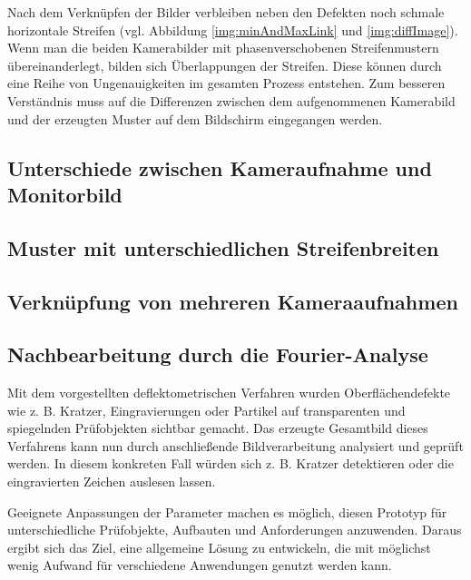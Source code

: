 Nach dem Verknüpfen der Bilder verbleiben neben den Defekten noch schmale horizontale Streifen (vgl. Abbildung \ref{img:minAndMaxLink} und \ref{img:diffImage}).
Wenn man die beiden Kamerabilder mit phasenverschobenen Streifenmustern übereinanderlegt, bilden sich Überlappungen der Streifen.
Diese können durch eine Reihe von Ungenauigkeiten im gesamten Prozess entstehen.
Zum besseren Verständnis muss auf die Differenzen zwischen dem aufgenommenen Kamerabild und der erzeugten Muster auf dem Bildschirm eingegangen werden.

{
	\FloatBarrier
    \subsection{Unterschiede zwischen Kameraufnahme und Monitorbild}
    \label{sub:unterschiedeKameraUndMonitor}
    
}

{
	\FloatBarrier
    \subsection{Muster mit unterschiedlichen Streifenbreiten}
    \label{sub:musterUnterschiedlichenStreifenbreiten}
    
}

{
	\FloatBarrier
    \subsection{Verknüpfung von mehreren Kameraaufnahmen}
    \label{sub:verknuepfungMehrererKameraaufnahmen}
    
}

{
	\FloatBarrier
    \subsection{Nachbearbeitung durch die Fourier-Analyse}
    \label{sub:nachbearbeitungFourierAnalyse}
    
}

\noindent
Mit dem vorgestellten deflektometrischen Verfahren wurden Oberflächen\-de\-fekte wie z. B. Kratzer, Eingravierungen oder Partikel auf transparenten und spiegelnden Prüfobjekten sichtbar gemacht.
Das erzeugte Gesamtbild dieses Verfahrens kann nun durch anschließende Bildverarbeitung analysiert und geprüft werden.
In diesem konkreten Fall würden sich z. B. Kratzer detektieren oder die eingravierten Zeichen auslesen lassen.

\p
Geeignete Anpassungen der Parameter machen es möglich, diesen Prototyp für unterschiedliche Prüfobjekte, Aufbauten und Anforderungen anzuwenden.
Daraus ergibt sich das Ziel, eine allgemeine Lösung zu entwickeln, die mit möglichst wenig Aufwand für verschiedene Anwendungen genutzt werden kann.